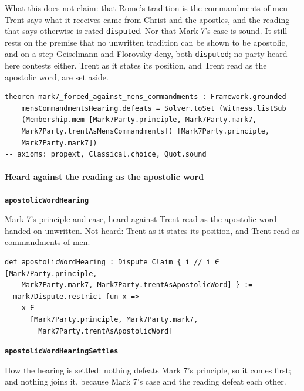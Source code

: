 \documentclass[11pt]{article}
\begin{document}
What this does not claim: that Rome’s tradition is the commandments of men — Trent says what it receives came from Christ and the apostles, and the reading that says otherwise is rated \texttt{disputed}. Nor that Mark 7’s case is sound. It still rests on the premise that no unwritten tradition can be shown to be apostolic, and on a step Geiselmann and Florovsky deny, both \texttt{disputed}; no party heard here contests either. Trent as it states its position, and Trent read as the apostolic word, are set aside.

{\small\begin{verbatim}
theorem mark7_forced_against_mens_commandments : Framework.grounded
    mensCommandmentsHearing.defeats = Solver.toSet (Witness.listSub
    (Membership.mem [Mark7Party.principle, Mark7Party.mark7,
    Mark7Party.trentAsMensCommandments]) [Mark7Party.principle,
    Mark7Party.mark7])
-- axioms: propext, Classical.choice, Quot.sound
\end{verbatim}}
\paragraph*{Heard against the reading as the apostolic word}
\leavevmode\par\nobreak
\par\medskip\noindent\textbf{\texttt{apostolic\allowbreak{}Word\allowbreak{}Hearing}}\par\nobreak\noindent
Mark 7’s principle and case, heard against Trent read as the apostolic word handed on unwritten. Not heard: Trent as it states its position, and Trent read as commandments of men.

{\small\begin{verbatim}
def apostolicWordHearing : Dispute Claim { i // i ∈ [Mark7Party.principle,
    Mark7Party.mark7, Mark7Party.trentAsApostolicWord] } :=
  mark7Dispute.restrict fun x =>
    x ∈
      [Mark7Party.principle, Mark7Party.mark7,
        Mark7Party.trentAsApostolicWord]
\end{verbatim}}
\par\medskip\noindent\textbf{\texttt{apostolic\allowbreak{}Word\allowbreak{}Hearing\allowbreak{}Settles}}\par\nobreak\noindent
How the hearing is settled: nothing defeats Mark 7’s principle, so it comes first; and nothing joins it, because Mark 7’s case and the reading defeat each other.
\end{document}
